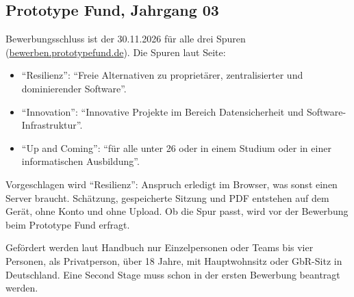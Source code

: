 \documentclass[11pt,a4paper,parskip=half-]{scrartcl}
\begin{document}
\subsection{Prototype Fund, Jahrgang 03}
%
Bewerbungsschluss ist der 30.11.2026 für alle drei Spuren
(\href{https://bewerben.prototypefund.de/}{bewerben.prototypefund.de}). Die Spuren laut Seite:
\begin{itemize}
  \item \enquote{Resilienz}: \enquote{Freie Alternativen zu proprietärer, zentralisierter und
        dominierender Software}.
  \item \enquote{Innovation}: \enquote{Innovative Projekte im Bereich Datensicherheit und
        Software-Infrastruktur}.
  \item \enquote{Up and Coming}: \enquote{für alle unter 26 oder in einem Studium oder in einer
        informatischen Ausbildung}.
\end{itemize}
Vorgeschlagen wird \enquote{Resilienz}: Anspruch erledigt im Browser, was sonst einen Server braucht.
Schätzung, gespeicherte Sitzung und PDF entstehen auf dem Gerät, ohne Konto und ohne Upload.
Ob die Spur passt, wird vor der Bewerbung beim Prototype Fund erfragt.

Gefördert werden laut Handbuch nur Einzelpersonen oder Teams bis vier Personen, als Privatperson,
über 18 Jahre, mit Hauptwohnsitz oder GbR-Sitz in Deutschland.
Eine Second Stage muss schon in der ersten Bewerbung beantragt werden.%
\end{document}
